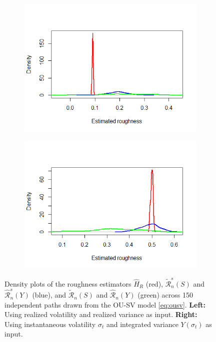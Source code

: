 \documentclass{article}
\begin{document}
\begin{figure}[htbp]
    \centering
    
    \begin{subfigure}{0.48\textwidth}
        \includegraphics[width=\linewidth]{ex6_densRV.png}
    \end{subfigure}
    \hfill
    \begin{subfigure}{0.48\textwidth}
        \includegraphics[width=\linewidth]{ex6_densIV.png}
    \end{subfigure}
    
    \caption{Density plots of the roughness estimators $\widehat{H}_{R}$ (red), $\widetilde{\mathscr{R}}_n^s(S)$ and $\widehat{\mathscr{R}}_n^s(Y)$ (blue), and $\widetilde{\mathscr{R}}_n(S)$ and $\widehat{\mathscr{R}}_n(Y)$ (green) across 150 independent paths drawn from the OU-SV model \eqref{eq:ousv}. \textbf{Left:} Using realized volatility and realized variance as input. \textbf{Right:} Using instantaneous volatility $\sigma_t$ and integrated variance $Y(\sigma_t)$ as input.}
    \label{fig:ex6dens}
\end{figure}\\\\
\end{document}

